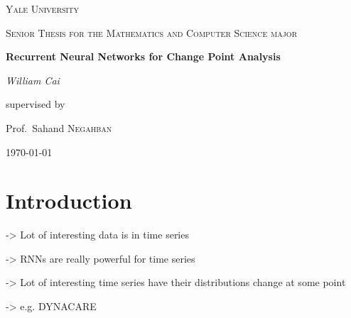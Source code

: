 \documentclass[12pt,a4paper]{article}
\begin{document}
\begin{titlepage}
	\centering
	{\scshape\LARGE Yale University \par}
	\vspace{1cm}
	{\scshape\Large Senior Thesis for the Mathematics and Computer Science major\par}
	\vspace{1.5cm}
	{\huge\bfseries Recurrent Neural Networks for Change Point Analysis\par}
	\vspace{2cm}
	{\Large\itshape William Cai\par}
	\vfill
	supervised by\par
	Prof.~Sahand \textsc{Negahban}

	\vfill

	{\large \today\par}
\end{titlepage}
\begin{abstract}
In this paper we present a synthetic time-series dataset which is motivated by vital measurements for patients in the ICU (MIMIC).  At time zero, the time series moves according to one probability distribution.  We then have some criterion (motivated by events such as cardiac arrest), which a fraction of the generated examples trigger, causing the probability distribution to change for the remainder of the time series.  We then try to solve the problems of regression, predicting what the next measurement will be, and classification, predicting which generation function is currently generating the data, on this dataset.  The models we consider include a random forest, single-layer perceptron, deep neural network, and a recurrent neural network.  We give a comparison of the capability of these models to do this kind of change point analysis, and also consider their robustness in the face of missing data.  
\end{abstract}

\section{Introduction}




-> Lot of interesting data is in time series

-> RNNs are really powerful for time series

-> Lot of interesting time series have their distributions change at some point

-> e.g. DYNACARE
\end{document}

